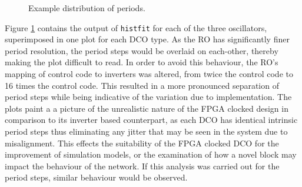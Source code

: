 \begin{figure}[h]%
    \centering
    \caption[Example distribution of periods]{Example distribution of periods.}    
    \label{fig:dists}
\end{figure}
Figure \ref{fig:dists} contains the output of \texttt{histfit} for each of the three oscillators, superimposed in one plot for each \ac{DCO} type. As the \ac{RO} has significantly finer period resolution, the period steps would be overlaid on each-other, thereby making the plot difficult to read. In order to avoid this behaviour, the \ac{RO}'s mapping of control code to inverters was altered, from twice the control code to 16 times the control code. This resulted in a more pronounced separation of period steps while being indicative of the variation due to implementation.
The plots paint a a picture of the unrealistic nature of the \ac{FPGA} clocked design in comparison to its inverter based counterpart, as each \ac{DCO} has identical intrinsic period steps thus eliminating any jitter that may be seen in the system due to misalignment.
This effects the suitability of the FPGA clocked \ac{DCO} for the improvement of simulation models, or the examination of how a novel block may impact the behaviour of the network. If this analysis was carried out for the period steps, similar behaviour would be observed.


